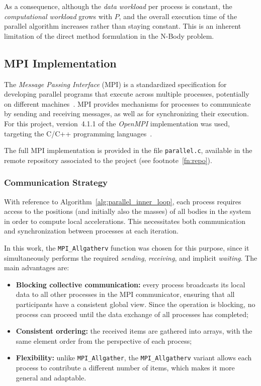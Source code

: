 \documentclass{article}
\begin{document}
As a consequence, although the \emph{data workload} per process is constant, the \emph{computational workload} grows with $P$, and the overall execution time of the parallel algorithm increases rather than staying constant.  
This is an inherent limitation of the direct method formulation in the N-Body problem.



\subsection{MPI Implementation}

The \emph{Message Passing Interface} (MPI) is a standardized specification for developing parallel programs that execute across multiple processes, potentially on different machines~\cite{mpi_standard}.
MPI provides mechanisms for processes to communicate by sending and receiving messages, as well as for synchronizing their execution.
For this project, version~4.1.1 of the \emph{OpenMPI} implementation was used, targeting the C/C++ programming languages~\cite{openmpi_docs}.

The full MPI implementation is provided in the file \texttt{parallel.c}, available in the remote repository associated to the project (see footnote~\ref{fn:repo}).

\subsubsection{Communication Strategy}

With reference to Algorithm~\ref{alg:parallel_inner_loop}, each process requires access to the positions (and initially also the masses) of all bodies in the system in order to compute local accelerations.  
This necessitates both communication and synchronization between processes at each iteration.

In this work, the \texttt{MPI\_Allgatherv} function was chosen for this purpose, since it simultaneously performs the required \emph{sending}, \emph{receiving}, and implicit \emph{waiting}.  
The main advantages are:
\begin{itemize}
    \item \textbf{Blocking collective communication:} every process broadcasts its local data to all other processes in the MPI communicator, ensuring that all participants have a consistent global view. Since the operation is blocking, no process can proceed until the data exchange of all processes has completed;
    \item \textbf{Consistent ordering:} the received items are gathered into arrays, with the same element order from the perspective of each process;
    \item \textbf{Flexibility:} unlike \texttt{MPI\_Allgather}, the \texttt{MPI\_Allgatherv} variant allows each process to contribute a different number of items, which makes it more general and adaptable.
\end{itemize}
\end{document}
